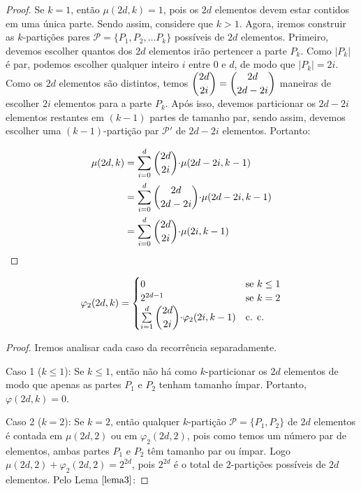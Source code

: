 \documentclass[12pt]{article}
\begin{document}
{\begin{proof} 
	Se $k=1$, então $\mu(2d, k) = 1$, pois os $2d$ elementos devem estar contidos em uma única parte. Sendo assim, considere que $k > 1$. Agora, iremos construir as $k$-partições pares $\mathcal{P}=\{P_1, P_2, \ldots P_k\}$ possíveis de $2d$ elementos. Primeiro, devemos escolher quantos dos $2d$ elementos irão pertencer a parte $P_k$. Como $|P_k|$ é par, podemos escolher qualquer inteiro $i$ entre $0$ e $d$, de modo que $|P_k| = 2i$. Como os $2d$ elementos são distintos, temos $\escolhe{2d}{2i} = \escolhe{2d}{2d - 2i}$ maneiras de escolher $2i$ elementos para a parte $P_k$. Após isso, devemos particionar os $2d - 2i$ elementos restantes em $(k-1)$ partes de tamanho par, sendo assim, devemos escolher uma $(k-1)$-partição par $\mathcal{P'}$ de $2d - 2i$ elementos. Portanto: 
	
	\begin{align}
		\begin{split}
			\mu(2d, k) &= \sum\limits_{i = 0}^{d}\escolhe{2d}{2i} {\cdot} \mu(2d - 2i, k-1) \\
			&= \sum\limits_{i = 0}^{d}\escolhe{2d}{2d - 2i} {\cdot} \mu(2d - 2i, k-1)\\
			&= \sum\limits_{i = 0}^{d}\escolhe{2d}{2i} {\cdot} \mu(2i, k-1)  
		\end{split} 
	\end{align}  
\end{proof} \newl


\begin{lema}    
	\label{lema4}
	\begin{equation}
		\varphi_2(2d, k) =
		\begin{cases}
			0 & \text{se $k \leq 1$}\\
			2^{2d - 1} & \text{se $k = 2$} \\
			\sum\limits_{i = 1}^{d} \escolhe{2d}{2i} {\cdot} \varphi_2(2i, k-1) & \text{c. c.} \\ 
		\end{cases}
	\end{equation} 
\end{lema}

\begin{proof} 
	Iremos analisar cada caso da recorrência separadamente. \newl
	
	Caso 1 ($k \leq 1$): Se $k \leq 1$, então não há como $k$-particionar os $2d$ elementos de modo que apenas as partes $P_1$ e $P_2$ tenham tamanho ímpar. Portanto, $\varphi(2d, k) = 0$. \newl
	
	Caso 2 ($k = 2$): Se $k = 2$, então qualquer $k$-partição $\mathcal{P} = \{P_1, P_2\}$ de $2d$ elementos é contada em $\mu(2d, 2)$ ou em $\varphi_2(2d, 2)$, pois como temos um número par de elementos, ambas partes $P_1$ e $P_2$ têm tamanho par ou ímpar. Logo $\mu(2d, 2) + \varphi_2(2d, 2) = 2^{2d}$, pois $2^{2d}$ é o total de $2$-partições possíveis de $2d$ elementos. Pelo Lema $\ref{lema3}$:
	

\end{proof}}
\end{document}
